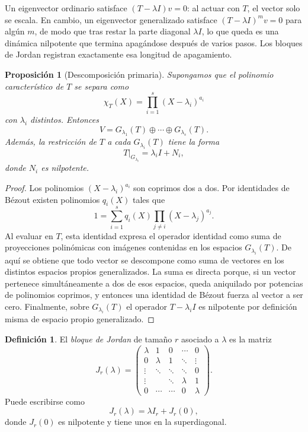 \documentclass[10pt,a4paper,oneside]{article}
\theoremstyle{plain}
\newtheorem{proposition}[theorem]{Proposición}
\theoremstyle{definition}
\newtheorem{definition}[theorem]{Definición}
\theoremstyle{remark}
\begin{document}
\begin{intuitionBox}
Un eigenvector ordinario satisface \((T-\lambda I)v=0\): al actuar con \(T\), el vector solo se escala. En cambio, un eigenvector generalizado satisface \((T-\lambda I)^m v=0\) para algún \(m\), de modo que tras restar la parte diagonal \(\lambda I\), lo que queda es una dinámica nilpotente que termina apagándose después de varios pasos. Los bloques de Jordan registran exactamente esa longitud de apagamiento.
\end{intuitionBox}

\begin{proposition}[Descomposición primaria]
Supongamos que el polinomio característico de \(T\) se separa como
\[
\chi_T(X)=\prod_{i=1}^s (X-\lambda_i)^{a_i}
\]
con \(\lambda_i\) distintos. Entonces
\[
V=G_{\lambda_1}(T)\oplus\cdots\oplus G_{\lambda_s}(T).
\]
Además, la restricción de \(T\) a cada \(G_{\lambda_i}(T)\) tiene la forma
\[
T|_{G_{\lambda_i}}=\lambda_i I+N_i,
\]
donde \(N_i\) es nilpotente.
\end{proposition}

\begin{proof}
Los polinomios \((X-\lambda_i)^{a_i}\) son coprimos dos a dos. Por identidades de Bézout existen polinomios \(q_i(X)\) tales que
\[
1=\sum_{i=1}^s q_i(X)\prod_{j\ne i}(X-\lambda_j)^{a_j}.
\]
Al evaluar en \(T\), esta identidad expresa el operador identidad como suma de proyecciones polinómicas con imágenes contenidas en los espacios \(G_{\lambda_i}(T)\). De aquí se obtiene que todo vector se descompone como suma de vectores en los distintos espacios propios generalizados. La suma es directa porque, si un vector pertenece simultáneamente a dos de esos espacios, queda aniquilado por potencias de polinomios coprimos, y entonces una identidad de Bézout fuerza al vector a ser cero. Finalmente, sobre \(G_{\lambda_i}(T)\) el operador \(T-\lambda_i I\) es nilpotente por definición misma de espacio propio generalizado.
\end{proof}

\begin{definition}
El \emph{bloque de Jordan} de tamaño \(r\) asociado a \(\lambda\) es la matriz
\[
J_r(\lambda)=
\begin{pmatrix}
\lambda & 1 & 0 & \cdots & 0\\
0 & \lambda & 1 & \ddots & \vdots\\
\vdots & \ddots & \ddots & \ddots & 0\\
\vdots &  & \ddots & \lambda & 1\\
0 & \cdots & \cdots & 0 & \lambda
\end{pmatrix}.
\]
Puede escribirse como
\[
J_r(\lambda)=\lambda I_r+J_r(0),
\]
donde \(J_r(0)\) es nilpotente y tiene unos en la superdiagonal.
\end{definition}
\end{document}
